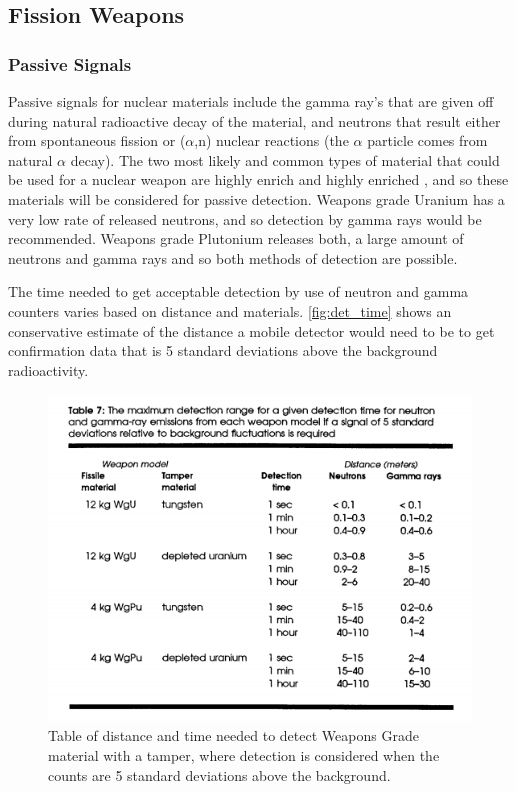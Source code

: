 \documentclass{report}
\begin{document}
 
\subsection{Fission Weapons}
 
   \subsubsection{Passive Signals}

Passive signals for nuclear materials include the gamma ray’s that are given off during natural radioactive decay of the material, and neutrons that result either from spontaneous fission or (\(\alpha\),n) nuclear reactions (the \(\alpha\) particle comes from natural \(\alpha\) decay). The two most likely and common types of material that could be used for a nuclear weapon are highly enrich  and highly enriched , and so these materials will be considered for passive detection. Weapons grade Uranium has a very low rate of released neutrons, and so detection by gamma rays would be recommended. Weapons grade Plutonium releases both, a large amount of neutrons and gamma rays and so both methods of detection are possible. 

The time needed to get acceptable detection by use of neutron and gamma counters varies based on distance and materials. \autoref{fig:det_time} shows an conservative estimate of the distance a mobile detector would need to be to get confirmation data that is 5 standard deviations above the background radioactivity. 


\begin{figure}[h]
 \centering
 \includegraphics[trim = 0cm 0cm 0cm 2cm, clip,scale=0.6]{./figures/det_time.png}
   \caption{Table of distance and time needed to detect Weapons Grade  material with a tamper, where detection is considered when the counts are 5 standard deviations above the background. \cite{Fetter1990}}
     \label{fig:det_time}
\end{figure}
\end{document}

